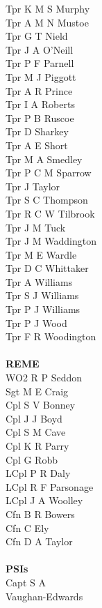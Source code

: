\begin{multicols}{4}
  Tpr K M S Murphy \\
  Tpr A M N Mustoe \\
  Tpr G T Nield \\
  Tpr J A O'Neill \\
  Tpr P F Parnell \\
  Tpr M J Piggott \\
  Tpr A R Prince \\
  Tpr I A Roberts \\
  Tpr P B Ruscoe \\
  Tpr D Sharkey \\
  Tpr A E Short \\
  Tpr M A Smedley \\
  Tpr P C M Sparrow \\
  Tpr J Taylor \\
  Tpr S C Thompson \\
  Tpr R C W Tilbrook \\
  Tpr J M Tuck \\
  Tpr J M Waddington \\
  Tpr M E Wardle \\
  Tpr D C Whittaker \\
  Tpr A Williams \\
  Tpr S J Williams \\
  Tpr P J Williams \\
  Tpr P J Wood \\
  Tpr F R Woodington \\ \\
  \textbf{REME} \\
  WO2 R P Seddon \\
  Sgt M E Craig \\
  Cpl S V Bonney \\
  Cpl J J Boyd \\
  Cpl S M Cave \\
  Cpl K R Parry \\
  Cpl G Robb \\
  LCpl P R Daly \\
  LCpl R F Parsonage \\
  LCpl J A Woolley \\
  Cfn B R Bowers \\
  Cfn C Ely \\
  Cfn D A Taylor \\ \\
  \textbf{PSIs} \\
  Capt S A  \\ \indent Vaughan-Edwards \\

\end{multicols}
